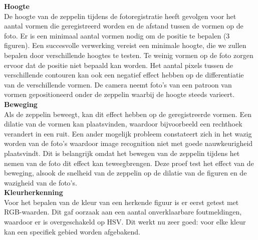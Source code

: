 \documentclass[eind]{penoverslag}
\begin{document}
\textbf{Hoogte}\\
De hoogte van de zeppelin tijdens de fotoregistratie heeft gevolgen voor het aantal vormen die geregistreerd worden en de afstand tussen de vormen op de foto. Er is een minimaal aantal vormen nodig om de positie te bepalen (3 figuren). Een succesvolle verwerking vereist een minimale hoogte, die we zullen bepalen door verschillende hoogtes te testen. Te weinig vormen op de foto zorgen ervoor dat de positie niet bepaald kan worden. Het aantal pixels tussen de verschillende contouren kan ook een negatief effect hebben op de differentiatie van de verschillende vormen. De camera neemt foto’s van een patroon van vormen gepositioneerd onder de zeppelin waarbij de hoogte steeds varieert.\\ 
\textbf{Beweging}\\
Als de zeppelin beweegt, kan dit effect hebben op de geregistreerde vormen. Een dilatie van de vormen kan plaatsvinden, waardoor bijvoorbeeld een rechthoek verandert in een ruit. Een ander mogelijk probleem constateert zich in het wazig worden van de foto’s waardoor image recognition niet met goede nauwkeurigheid plaatsvindt. Dit is belangrijk omdat het bewegen van de zeppelin tijdens het nemen van de foto dit effect kan teweegbrengen. Deze proef test het effect van de beweging, alsook de snelheid van de zeppelin op de dilatie van de figuren en de wazigheid van de foto’s.  \\

\textbf{Kleurherkenning}\\
Voor het bepalen van de kleur van een herkende figuur is er eerst getest met RGB-waarden. Dit gaf oorzaak aan een aantal onverklaarbare foutmeldingen, waardoor er is overgeschakeld op HSV. Dit werkt nu zeer goed: voor elke kleur kan een specifiek gebied worden afgebakend. \\
\end{document}
